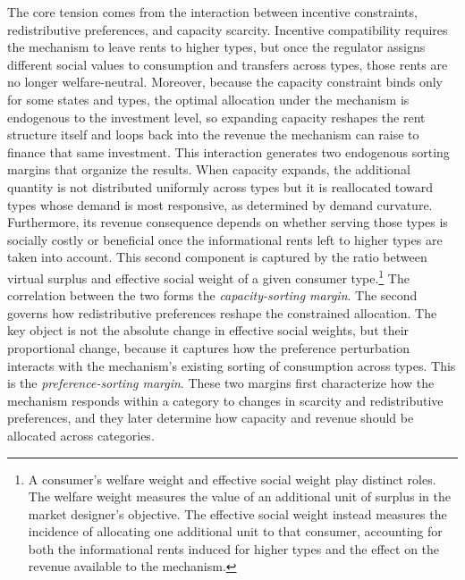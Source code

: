\documentclass{class}
\begin{document}
The core tension comes from the interaction between incentive constraints, redistributive preferences, and capacity scarcity. Incentive compatibility requires the mechanism to leave rents to higher types, but once the regulator assigns different social values to consumption and transfers across types, those rents are no longer welfare-neutral. Moreover, because the capacity constraint binds only for some states and types, the optimal allocation under the mechanism is endogenous to the investment level, so expanding capacity reshapes the rent structure itself and loops back into the revenue the mechanism can raise to finance that same investment. This interaction generates two endogenous sorting margins that organize the results. When capacity expands, the additional quantity is not distributed uniformly across types but it is reallocated toward types whose demand is most responsive, as determined by demand curvature. Furthermore, its revenue consequence depends on whether serving those types is socially costly or beneficial once the informational rents left to higher types are taken into account. This second component is captured by the ratio between virtual surplus and effective social weight of a given consumer type.\footnote{A consumer’s welfare weight and effective social weight play distinct roles. The welfare weight measures the value of an additional unit of surplus in the market designer’s objective. The effective social weight instead measures the incidence of allocating one additional unit to that consumer, accounting for both the informational rents induced for higher types and the effect on the revenue available to the mechanism.} The correlation between the two forms the \textit{capacity-sorting margin}. The second governs how redistributive preferences reshape the constrained allocation. The key object is not the absolute change in effective social weights, but their proportional change, because it captures how the preference perturbation interacts with the mechanism’s existing sorting of consumption across types. This is the \textit{preference-sorting margin}. These two margins first characterize how the mechanism responds within a category to changes in scarcity and redistributive preferences, and they later determine how capacity and revenue should be allocated across categories.
\end{document}
